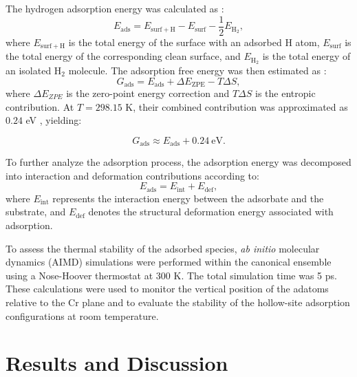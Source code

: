 \documentclass[a4paper,fleqn]{cas-dc}
\begin{document}
The hydrogen adsorption energy was calculated as \cite{Liao2022,GomezQuispe2026}:
\begin{equation}
    E_{\mathrm{ads}} = E_{\mathrm{surf+H}} - E_{\mathrm{surf}} - \frac{1}{2}E_{\mathrm{H_2}},
\end{equation}
where $E_{\mathrm{surf+H}}$ is the total energy of the surface with an adsorbed H atom, $E_{\mathrm{surf}}$ is the total energy of the corresponding clean surface, and $E_{\mathrm{H_2}}$ is the total energy of an isolated H$_2$ molecule. The adsorption free energy was then estimated as \cite{Liao2022,GomezQuispe2026}:
\begin{equation}
    G_{\mathrm{ads}} = E_{\mathrm{ads}} + \Delta E_{\mathrm{ZPE}} - T\Delta S,
\end{equation}
where $\Delta E_{ZPE}$ is the zero-point energy correction and $T\Delta S$ is the entropic contribution. At $T = 298.15$ K, their combined contribution was approximated as $0.24$ eV \cite{Norskov_2005}, yielding:

\begin{equation}
    G_{\mathrm{ads}} \approx E_{\mathrm{ads}} + 0.24~\mathrm{eV}.
\end{equation}

To further analyze the adsorption process, the adsorption energy was decomposed into interaction and deformation contributions according to:
\begin{equation}
    E_{\mathrm{ads}} = E_{\mathrm{int}} + E_{\mathrm{def}},
\end{equation}
where $E_{\mathrm{int}}$ represents the interaction energy between the adsorbate and the substrate, and $E_{\mathrm{def}}$ denotes the structural deformation energy associated with adsorption.

To assess the thermal stability of the adsorbed species, \textit{ab initio} molecular dynamics (AIMD) simulations were performed within the canonical ensemble using a Nose-Hoover thermostat \cite{Nose1984,Hoover1985}at 300 K. The total simulation time was 5 ps. These calculations were used to monitor the vertical position of the adatoms relative to the Cr plane and to evaluate the stability of the hollow-site adsorption configurations at room temperature.

\section{Results and Discussion}
\end{document}
